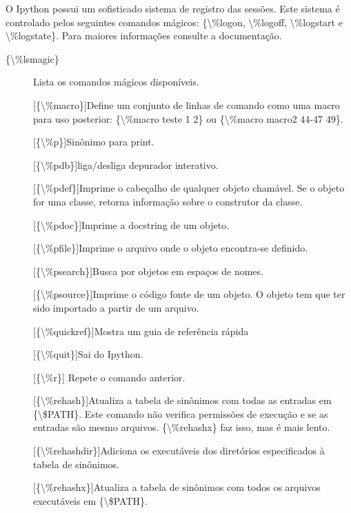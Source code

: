 \documentclass[a4paper,10pt,brazil]{sphinxmanual}
\begin{document}
O Ipython possui um sofisticado sistema de registro das sessões.
Este sistema é controlado pelos seguintes comandos mágicos:
\{\textbackslash{}\%logon, \textbackslash{}\%logoff, \textbackslash{}\%logstart e \textbackslash{}\%logstate\}. Para maiores
informações consulte a documentação.
\begin{description}
\item[{\{\textbackslash{}\%lsmagic\}}] \leavevmode
Lista os comandos mágicos disponíveis.

{[}\{\textbackslash{}\%macro\}{]}Define um conjunto de linhas de comando como uma macro
para uso posterior: \{\textbackslash{}\%macro teste 1 2\} ou
\{\textbackslash{}\%macro macro2 44-47 49\}.

{[}\{\textbackslash{}\%p\}{]}Sinônimo para print.

{[}\{\textbackslash{}\%pdb\}{]}liga/desliga depurador interativo.

{[}\{\textbackslash{}\%pdef\}{]}Imprime o cabeçalho de qualquer objeto chamável. Se o
objeto for uma classe, retorna informação sobre o construtor da
classe.

{[}\{\textbackslash{}\%pdoc\}{]}Imprime a docstring de um objeto.

{[}\{\textbackslash{}\%pfile\}{]}Imprime o arquivo onde o objeto encontra-se definido.

{[}\{\textbackslash{}\%psearch\}{]}Busca por objetos em espaços de nomes.

{[}\{\textbackslash{}\%psource\}{]}Imprime o código fonte de um objeto. O objeto tem que
ter sido importado a partir de um arquivo.

{[}\{\textbackslash{}\%quickref\}{]}Mostra um guia de referência rápida

{[}\{\textbackslash{}\%quit\}{]}Sai do Ipython.

{[}\{\textbackslash{}\%r\}{]} Repete o comando anterior.

{[}\{\textbackslash{}\%rehash\}{]}Atualiza a tabela de sinônimos com todas as entradas
em \{\textbackslash{}\$PATH\}. Este comando não verifica permissões de execução e se
as entradas são mesmo arquivos. \{\textbackslash{}\%rehashx\} faz isso, mas é mais
lento.

{[}\{\textbackslash{}\%rehashdir\}{]}Adiciona os executáveis dos diretórios
especificados à tabela de sinônimos.

{[}\{\textbackslash{}\%rehashx\}{]}Atualiza a tabela de sinônimos com todos os arquivos
executáveis em \{\textbackslash{}\$PATH\}.


\end{description}
\end{document}
